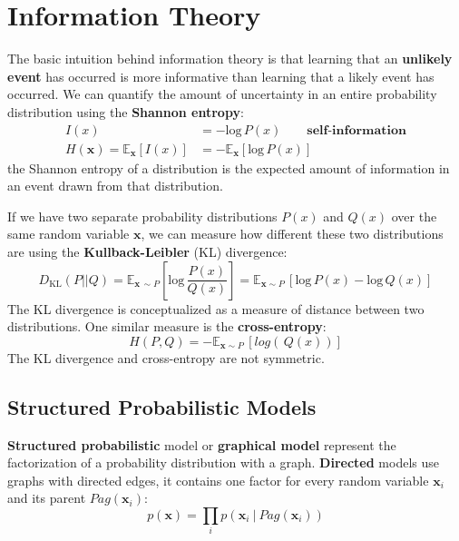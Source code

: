 \documentclass[12pt]{report}
\begin{document}
    \section{Information Theory}
        The basic intuition behind information theory is that learning that an \textbf{unlikely event} has occurred is more informative than learning that a likely event has occurred. We can quantify the amount of uncertainty in an entire probability distribution using the \textbf{Shannon entropy}:
        \begin{align}
            I(x) &= -\text{log}\,P(x)\qquad\textbf{self-information} \\  
            H(\mathbf{x}) = \mathbb{E}_{\mathbf{x}}[I(x)] &= -\mathbb{E}_{\mathbf{x}}[\text{log}\,P(x)]
        \end{align}
        the Shannon entropy of a distribution is the expected amount of information in an event drawn from that distribution.
        
        If we have two separate probability distributions $P(x)$ and $Q(x)$ over the same random variable $\mathbf{x}$, we can measure how different these two distributions are using the \textbf{Kullback-Leibler} (KL) divergence:
        \begin{equation}
            D_{\text{KL}}(P||Q) = \mathbb{E}_{\mathbf{x}\,\sim P}\left[\text{log}\,\frac{P(x)}{Q(x)}\right] = \mathbb{E}_{\mathbf{x}\sim P}\,[\text{log}\,P(x) - \text{log}\,Q(x)]
        \end{equation}
        The KL divergence is conceptualized as a measure of distance between two distributions. One similar measure is the \textbf{cross-entropy}:
        \begin{equation}
            H(P,Q) = -\mathbb{E}_{\mathbf{x}\sim P}\,[log(\,Q(x))]
        \end{equation}
        The KL divergence and cross-entropy are not symmetric.
    \subsection{Structured Probabilistic Models}
        \textbf{Structured probabilistic} model or \textbf{graphical model} represent the factorization of a probability distribution with a graph.
        \textbf{Directed} models use graphs with directed edges, it contains one factor for every random variable $\mathbf{x}_i$ and its parent $Pag(\mathbf{x}_i)$:
        \begin{equation}
            p(\boldsymbol{\mathbf{x}}) = \prod_i{p(\mathbf{x}_i~|~Pag(\mathbf{x}_i))}
        \end{equation}
        
\end{document}

